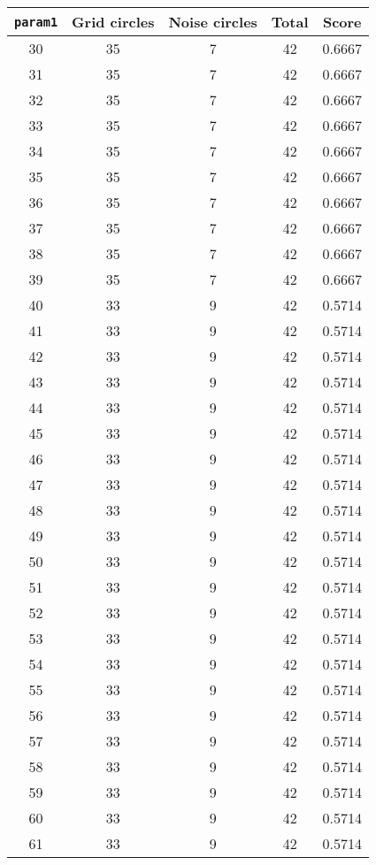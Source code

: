 \documentclass[letterpaper, 12pt]{article}
\begin{document}
\begin{longtable}{|c|c|c|c|c|}
\hline
\textbf{\texttt{param1}} & \textbf{Grid circles} & \textbf{Noise circles} & \textbf{Total} & \textbf{Score} \\
\hline
30 & 35 & 7 & 42 & 0.6667 \\
\hline
31 & 35 & 7 & 42 & 0.6667 \\
\hline
32 & 35 & 7 & 42 & 0.6667 \\
\hline
33 & 35 & 7 & 42 & 0.6667 \\
\hline
34 & 35 & 7 & 42 & 0.6667 \\
\hline
35 & 35 & 7 & 42 & 0.6667 \\
\hline
36 & 35 & 7 & 42 & 0.6667 \\
\hline
37 & 35 & 7 & 42 & 0.6667 \\
\hline
38 & 35 & 7 & 42 & 0.6667 \\
\hline
39 & 35 & 7 & 42 & 0.6667 \\
\hline
40 & 33 & 9 & 42 & 0.5714 \\
\hline
41 & 33 & 9 & 42 & 0.5714 \\
\hline
42 & 33 & 9 & 42 & 0.5714 \\
\hline
43 & 33 & 9 & 42 & 0.5714 \\
\hline
44 & 33 & 9 & 42 & 0.5714 \\
\hline
45 & 33 & 9 & 42 & 0.5714 \\
\hline
46 & 33 & 9 & 42 & 0.5714 \\
\hline
47 & 33 & 9 & 42 & 0.5714 \\
\hline
48 & 33 & 9 & 42 & 0.5714 \\
\hline
49 & 33 & 9 & 42 & 0.5714 \\
\hline
50 & 33 & 9 & 42 & 0.5714 \\
\hline
51 & 33 & 9 & 42 & 0.5714 \\
\hline
52 & 33 & 9 & 42 & 0.5714 \\
\hline
53 & 33 & 9 & 42 & 0.5714 \\
\hline
54 & 33 & 9 & 42 & 0.5714 \\
\hline
55 & 33 & 9 & 42 & 0.5714 \\
\hline
56 & 33 & 9 & 42 & 0.5714 \\
\hline
57 & 33 & 9 & 42 & 0.5714 \\
\hline
58 & 33 & 9 & 42 & 0.5714 \\
\hline
59 & 33 & 9 & 42 & 0.5714 \\
\hline
60 & 33 & 9 & 42 & 0.5714 \\
\hline
61 & 33 & 9 & 42 & 0.5714 \\

\end{longtable}
\end{document}
